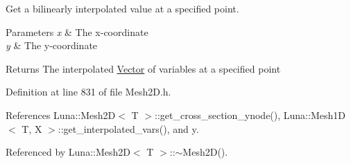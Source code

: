 Get a bilinearly interpolated value at a specified point. 


\begin{DoxyParams}{Parameters}
{\em x} & The x-\/coordinate \\
\hline
{\em y} & The y-\/coordinate \\
\hline
\end{DoxyParams}
\begin{DoxyReturn}{Returns}
The interpolated \hyperlink{classLuna_1_1Vector}{Vector} of variables at a specified point 
\end{DoxyReturn}


Definition at line 831 of file Mesh2\+D.\+h.



References Luna\+::\+Mesh2\+D$<$ T $>$\+::get\+\_\+cross\+\_\+section\+\_\+ynode(), Luna\+::\+Mesh1\+D$<$ T, X $>$\+::get\+\_\+interpolated\+\_\+vars(), and y.



Referenced by Luna\+::\+Mesh2\+D$<$ T $>$\+::$\sim$\+Mesh2\+D().



